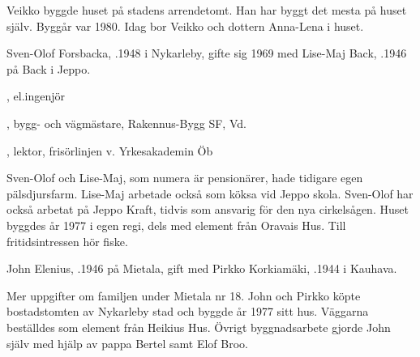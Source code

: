 Veikko byggde huset på stadens arrendetomt. Han har byggt det mesta på huset själv. Byggår var 1980. Idag bor Veikko och dottern Anna-Lena i huset.



%



%
Sven-Olof Forsbacka, .1948 i Nykarleby, gifte sig 1969 med Lise-Maj Back, .1946 på Back i Jeppo.
\begin{jhchildren}
  \item {}, el.ingenjör
  \item {}, bygg- och vägmästare, Rakennus-Bygg SF, Vd.
  \item {}, lektor, frisörlinjen v. Yrkesakademin Öb
\end{jhchildren}

Sven-Olof och Lise-Maj, som numera är pensionärer, hade tidigare egen pälsdjursfarm. Lise-Maj arbetade också som köksa vid Jeppo skola. Sven-Olof har också arbetat på Jeppo Kraft, tidvis som ansvarig för den nya cirkelsågen. Huset byggdes år 1977 i egen regi, dels med element från Oravais Hus. Till fritidsintressen hör fiske.



%



%
John Elenius, .1946 på Mietala, gift med Pirkko Korkiamäki, .1944 i Kauhava.
\begin{jhchildren}
  \item {}
  \item {}
\end{jhchildren}

Mer uppgifter om familjen under Mietala nr 18. John och Pirkko köpte bostadstomten av Nykarleby stad och byggde år 1977 sitt hus. Väggarna beställdes som element från Heikius Hus. Övrigt byggnadsarbete gjorde John själv med hjälp av pappa Bertel samt Elof Broo.

